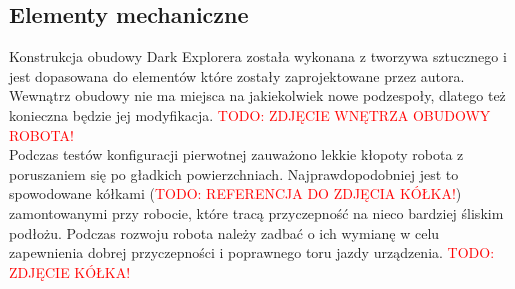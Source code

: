 \subsection{Elementy mechaniczne}
Konstrukcja obudowy Dark Explorera została wykonana z tworzywa sztucznego i jest dopasowana do elementów które zostały zaprojektowane przez autora. Wewnątrz obudowy nie ma miejsca na jakiekolwiek nowe podzespoły, dlatego też konieczna będzie jej modyfikacja.
\textcolor{red}{TODO: ZDJĘCIE WNĘTRZA OBUDOWY ROBOTA!}
\\

Podczas testów konfiguracji pierwotnej zauważono lekkie kłopoty robota z poruszaniem się po gładkich powierzchniach. Najprawdopodobniej jest to spowodowane kółkami (\textcolor{red}{TODO: REFERENCJA DO ZDJĘCIA KÓŁKA!}) zamontowanymi przy robocie, które tracą przyczepność na nieco bardziej śliskim podłożu. Podczas rozwoju robota należy zadbać o ich wymianę w celu zapewnienia dobrej przyczepności i poprawnego toru jazdy urządzenia.
\textcolor{red}{TODO: ZDJĘCIE KÓŁKA!}